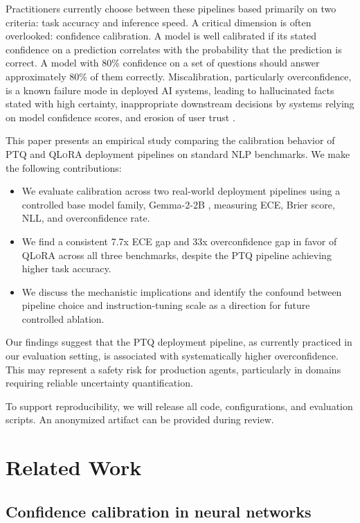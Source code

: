 \documentclass[10pt]{article}
\newcommand{\ptq}{\textsc{PTQ}}
\newcommand{\qlora}{\textsc{QLoRA}}
\newcommand{\ece}{\textsc{ECE}}
\newcommand{\nll}{\textsc{NLL}}
\begin{document}
Practitioners currently choose between these pipelines based primarily on two criteria: task accuracy and inference speed. A critical dimension is often overlooked: confidence calibration. A model is well calibrated if its stated confidence on a prediction correlates with the probability that the prediction is correct. A model with 80\% confidence on a set of questions should answer approximately 80\% of them correctly. Miscalibration, particularly overconfidence, is a known failure mode in deployed AI systems, leading to hallucinated facts stated with high certainty, inappropriate downstream decisions by systems relying on model confidence scores, and erosion of user trust \citep{guo2017calibration,kadavath2022know}.

This paper presents an empirical study comparing the calibration behavior of \ptq{} and \qlora{} deployment pipelines on standard NLP benchmarks. We make the following contributions:
\begin{itemize}
    \item We evaluate calibration across two real-world deployment pipelines using a controlled base model family, Gemma-2-2B \citep{gemma2024}, measuring \ece, Brier score, \nll, and overconfidence rate.
    \item We find a consistent 7.7x \ece{} gap and 33x overconfidence gap in favor of \qlora{} across all three benchmarks, despite the \ptq{} pipeline achieving higher task accuracy.
    \item We discuss the mechanistic implications and identify the confound between pipeline choice and instruction-tuning scale as a direction for future controlled ablation.
\end{itemize}

Our findings suggest that the \ptq{} deployment pipeline, as currently practiced in our evaluation setting, is associated with systematically higher overconfidence. This may represent a safety risk for production agents, particularly in domains requiring reliable uncertainty quantification.

To support reproducibility, we will release all code, configurations, and evaluation scripts. An anonymized artifact can be provided during review.

\section{Related Work}

\subsection{Confidence calibration in neural networks}
\end{document}
